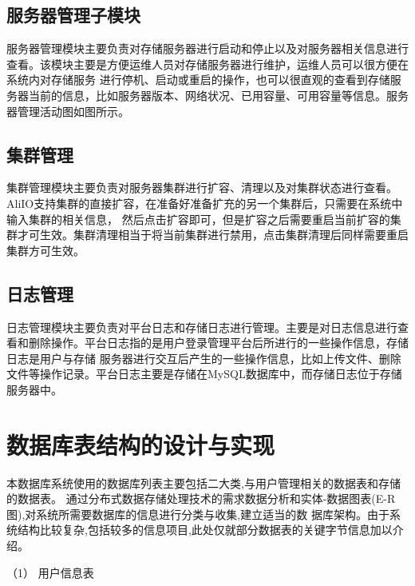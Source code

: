 \subsection{服务器管理子模块}
服务器管理模块主要负责对存储服务器进行启动和停止以及对服务器相关信息进行查看。该模块主要是方便运维人员对存储服务器进行维护，运维人员可以很方便在系统内对存储服务
进行停机、启动或重启的操作，也可以很直观的查看到存储服务器当前的信息，比如服务器版本、网络状况、已用容量、可用容量等信息。服务器管理活动图如图所示。

\subsection{集群管理}
集群管理模块主要负责对服务器集群进行扩容、清理以及对集群状态进行查看。AliIO支持集群的直接扩容，在准备好准备扩充的另一个集群后，只需要在系统中输入集群的相关信息，
然后点击扩容即可，但是扩容之后需要重启当前扩容的集群才可生效。集群清理相当于将当前集群进行禁用，点击集群清理后同样需要重启集群方可生效。

\subsection{日志管理}
日志管理模块主要负责对平台日志和存储日志进行管理。主要是对日志信息进行查看和删除操作。平台日志指的是用户登录管理平台后所进行的一些操作信息，存储日志是用户与存储
服务器进行交互后产生的一些操作信息，比如上传文件、删除文件等操作记录。平台日志主要是存储在MySQL数据库中，而存储日志位于存储服务器中。

\section{数据库表结构的设计与实现}



本数据库系统使用的数据库列表主要包括二大类,与用户管理相关的数据表和存储的数据表。
通过分布式数据存储处理技术的需求数据分析和实体-数据图表(E-R图),对系统所需要数据库的信息进行分类与收集,建立适当的数
据库架构。由于系统结构比较复杂,包括较多的信息项目,此处仅就部分数据表的关键字节信息加以介绍。

（1） 用户信息表


